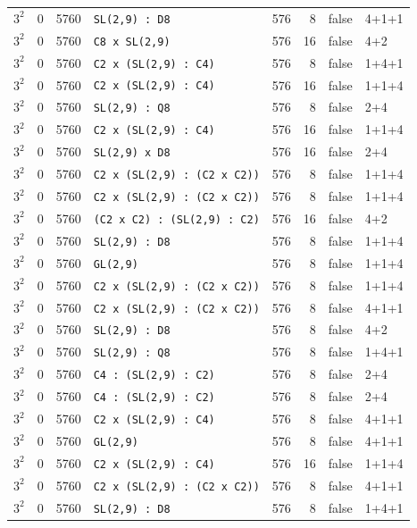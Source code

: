 \begin{longtable}{llrlrrll}
$3^2$ & 0 & 5760 & \texttt{SL(2,9) : D8} & 576 & 8 & false & 4+1+1\\
$3^2$ & 0 & 5760 & \texttt{C8 x SL(2,9)} & 576 & 16 & false & 4+2\\
$3^2$ & 0 & 5760 & \texttt{C2 x (SL(2,9) : C4)} & 576 & 8 & false & 1+4+1\\
$3^2$ & 0 & 5760 & \texttt{C2 x (SL(2,9) : C4)} & 576 & 16 & false & 1+1+4\\
$3^2$ & 0 & 5760 & \texttt{SL(2,9) : Q8} & 576 & 8 & false & 2+4\\
$3^2$ & 0 & 5760 & \texttt{C2 x (SL(2,9) : C4)} & 576 & 16 & false & 1+1+4\\
$3^2$ & 0 & 5760 & \texttt{SL(2,9) x D8} & 576 & 16 & false & 2+4\\
$3^2$ & 0 & 5760 & \texttt{C2 x (SL(2,9) : (C2 x C2))} & 576 & 8 & false & 1+1+4\\
$3^2$ & 0 & 5760 & \texttt{C2 x (SL(2,9) : (C2 x C2))} & 576 & 8 & false & 1+1+4\\
$3^2$ & 0 & 5760 & \texttt{(C2 x C2) : (SL(2,9) : C2)} & 576 & 16 & false & 4+2\\
$3^2$ & 0 & 5760 & \texttt{SL(2,9) : D8} & 576 & 8 & false & 1+1+4\\
$3^2$ & 0 & 5760 & \texttt{GL(2,9)} & 576 & 8 & false & 1+1+4\\
$3^2$ & 0 & 5760 & \texttt{C2 x (SL(2,9) : (C2 x C2))} & 576 & 8 & false & 1+1+4\\
$3^2$ & 0 & 5760 & \texttt{C2 x (SL(2,9) : (C2 x C2))} & 576 & 8 & false & 4+1+1\\
$3^2$ & 0 & 5760 & \texttt{SL(2,9) : D8} & 576 & 8 & false & 4+2\\
$3^2$ & 0 & 5760 & \texttt{SL(2,9) : Q8} & 576 & 8 & false & 1+4+1\\
$3^2$ & 0 & 5760 & \texttt{C4 : (SL(2,9) : C2)} & 576 & 8 & false & 2+4\\
$3^2$ & 0 & 5760 & \texttt{C4 : (SL(2,9) : C2)} & 576 & 8 & false & 2+4\\
$3^2$ & 0 & 5760 & \texttt{C2 x (SL(2,9) : C4)} & 576 & 8 & false & 4+1+1\\
$3^2$ & 0 & 5760 & \texttt{GL(2,9)} & 576 & 8 & false & 4+1+1\\
$3^2$ & 0 & 5760 & \texttt{C2 x (SL(2,9) : C4)} & 576 & 16 & false & 1+1+4\\
$3^2$ & 0 & 5760 & \texttt{C2 x (SL(2,9) : (C2 x C2))} & 576 & 8 & false & 4+1+1\\
$3^2$ & 0 & 5760 & \texttt{SL(2,9) : D8} & 576 & 8 & false & 1+4+1\\

\end{longtable}
